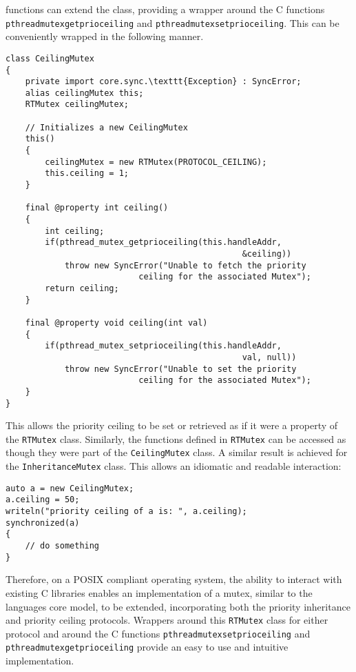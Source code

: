 functions can extend the class, providing a wrapper around the C functions 
\texttt{pthread\textunderscore{}mutex\textunderscore{}getprioceiling} and 
\texttt{pthread\textunderscore{}mutex\textunderscore{}setprioceiling}.
This can be conveniently wrapped in the following manner. 
\begin{lstlisting}
class CeilingMutex 
{
    private import core.sync.\texttt{Exception} : SyncError;
    alias ceilingMutex this;
    RTMutex ceilingMutex;

    // Initializes a new CeilingMutex
    this()
    {
        ceilingMutex = new RTMutex(PROTOCOL_CEILING);
        this.ceiling = 1;
    }

    final @property int ceiling()
    {
        int ceiling; 
        if(pthread_mutex_getprioceiling(this.handleAddr, 
                                                &ceiling))
            throw new SyncError("Unable to fetch the priority 
                           ceiling for the associated Mutex"); 
        return ceiling; 
    }

    final @property void ceiling(int val)
    {
        if(pthread_mutex_setprioceiling(this.handleAddr, 
                                                val, null))
            throw new SyncError("Unable to set the priority 
                           ceiling for the associated Mutex"); 
    }
}
\end{lstlisting}
This allows the priority ceiling to be set or retrieved as if it were a property of 
the \texttt{RTMutex} class. Similarly, the functions defined in \texttt{RTMutex} 
can be accessed as though they were part of the \texttt{CeilingMutex} class. 
A similar result is achieved for the \texttt{InheritanceMutex} class.
This allows an idiomatic and readable interaction: 
\begin{lstlisting}
auto a = new CeilingMutex;
a.ceiling = 50; 
writeln("priority ceiling of a is: ", a.ceiling); 
synchronized(a) 
{
    // do something
}
\end{lstlisting}
Therefore, on a POSIX compliant operating system, the ability to interact with 
existing C libraries enables an implementation of a mutex, similar to the languages 
core model, to be extended, incorporating both the priority inheritance and 
priority ceiling protocols. Wrappers around this \texttt{RTMutex} class for 
either protocol and around the C functions 
\texttt{pthread\textunderscore{}mutex\textunderscore{}setprioceiling} 
and \texttt{pthread\textunderscore{}mutex\textunderscore{}getprioceiling{}} 
provide an easy to use and intuitive implementation. 

